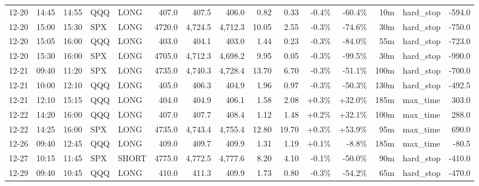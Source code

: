 \documentclass[11pt,a4paper,twoside]{article}
\begin{document}
\begin{landscape}
\begin{center}
\begin{longtable}{>{\color{txtmain}}l l l l l r r r r r r r r >{\color{txtmain}}l r}
12-20 & 14:45 & 14:55 & QQQ & LONG & 407.0 & 407.5 & 406.0 & 0.82 & 0.33 & \textcolor{lossred}{-0.4\%} & \textcolor{lossred}{-60.4\%} & 10m & hard\_stop & \textcolor{lossred}{-594.0} \\
12-20 & 15:00 & 15:30 & SPX & LONG & 4720.0 & 4,724.5 & 4,712.3 & 10.05 & 2.55 & \textcolor{lossred}{-0.3\%} & \textcolor{lossred}{-74.6\%} & 30m & hard\_stop & \textcolor{lossred}{-750.0} \\
12-20 & 15:05 & 16:00 & QQQ & LONG & 403.0 & 404.1 & 403.0 & 1.44 & 0.23 & \textcolor{lossred}{-0.3\%} & \textcolor{lossred}{-84.0\%} & 55m & hard\_stop & \textcolor{lossred}{-723.0} \\
12-20 & 15:30 & 16:00 & SPX & LONG & 4705.0 & 4,712.3 & 4,698.2 & 9.95 & 0.05 & \textcolor{lossred}{-0.3\%} & \textcolor{lossred}{-99.5\%} & 30m & hard\_stop & \textcolor{lossred}{-990.0} \\
12-21 & 09:40 & 11:20 & SPX & LONG & 4735.0 & 4,740.3 & 4,728.4 & 13.70 & 6.70 & \textcolor{lossred}{-0.3\%} & \textcolor{lossred}{-51.1\%} & 100m & hard\_stop & \textcolor{lossred}{-700.0} \\
12-21 & 10:00 & 12:10 & QQQ & LONG & 405.0 & 406.3 & 404.9 & 1.96 & 0.97 & \textcolor{lossred}{-0.3\%} & \textcolor{lossred}{-50.3\%} & 130m & hard\_stop & \textcolor{lossred}{-492.5} \\
12-21 & 12:10 & 15:15 & QQQ & LONG & 404.0 & 404.9 & 406.1 & 1.58 & 2.08 & \textcolor{wingreen}{+0.3\%} & \textcolor{wingreen}{+32.0\%} & 185m & max\_time & \textcolor{wingreen}{303.0} \\
12-22 & 14:20 & 16:00 & QQQ & LONG & 407.0 & 407.7 & 408.4 & 1.12 & 1.48 & \textcolor{wingreen}{+0.2\%} & \textcolor{wingreen}{+32.1\%} & 100m & max\_time & \textcolor{wingreen}{288.0} \\
12-22 & 14:25 & 16:00 & SPX & LONG & 4735.0 & 4,743.4 & 4,755.4 & 12.80 & 19.70 & \textcolor{wingreen}{+0.3\%} & \textcolor{wingreen}{+53.9\%} & 95m & max\_time & \textcolor{wingreen}{690.0} \\
12-26 & 09:40 & 12:45 & QQQ & LONG & 409.0 & 409.7 & 409.9 & 1.31 & 1.19 & \textcolor{wingreen}{+0.1\%} & \textcolor{lossred}{-8.8\%} & 185m & max\_time & \textcolor{lossred}{-80.5} \\
12-27 & 10:15 & 11:45 & SPX & SHORT & 4775.0 & 4,772.5 & 4,777.6 & 8.20 & 4.10 & \textcolor{lossred}{-0.1\%} & \textcolor{lossred}{-50.0\%} & 90m & hard\_stop & \textcolor{lossred}{-410.0} \\
12-29 & 09:40 & 10:45 & QQQ & LONG & 410.0 & 411.3 & 409.9 & 1.73 & 0.80 & \textcolor{lossred}{-0.3\%} & \textcolor{lossred}{-54.2\%} & 65m & hard\_stop & \textcolor{lossred}{-470.0} \\

\end{longtable}
\end{center}
\end{landscape}
\end{document}
